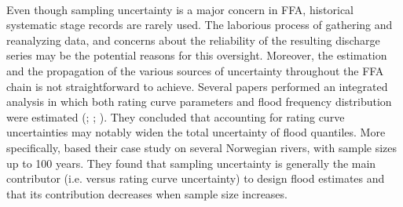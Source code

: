     \paragraph{}
    Even though sampling uncertainty is a major concern in FFA, historical systematic stage records are rarely used. The laborious process of gathering and reanalyzing data, and concerns about the reliability of the resulting discharge series may be the potential reasons for this oversight. Moreover, the estimation and the propagation of the various sources of uncertainty throughout the FFA chain is not straightforward to achieve. Several papers performed an integrated analysis in which both rating curve parameters and flood frequency distribution were estimated (\citet{petersen-overleir_accounting_2009}; \citet{steinbakk_propagation_2016}; \citet{vieira_assessing_2022}). They concluded that accounting for rating curve uncertainties may notably widen the total uncertainty of flood quantiles. More specifically, \citet{steinbakk_propagation_2016} based their case study on several Norwegian rivers, with sample sizes up to 100 years. They found that sampling uncertainty is generally the main contributor (i.e. versus rating curve uncertainty) to design flood estimates and that its contribution decreases when sample size increases.


